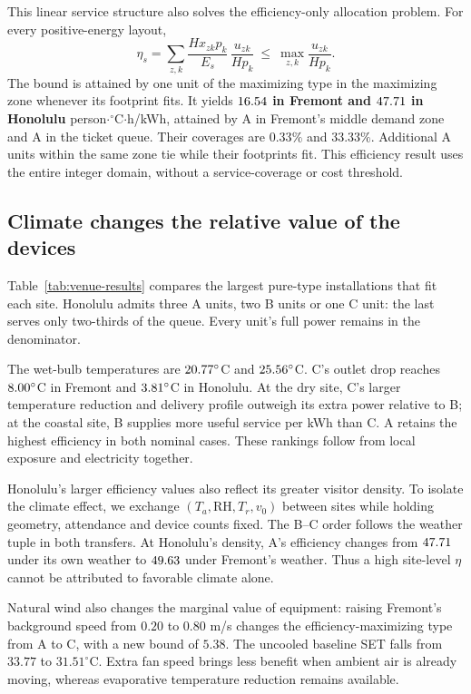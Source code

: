 This linear service structure also solves the efficiency-only allocation problem. For every positive-energy layout,
\begin{equation}
 \eta_s=\sum_{z,k}\frac{Hx_{zk}p_k}{E_s}\,
                  \frac{u_{zk}}{Hp_k}
 \ \le\ \max_{z,k}\frac{u_{zk}}{Hp_k}.
\label{eq:venue-bound}
\end{equation}
The bound is attained by one unit of the maximizing type in the maximizing zone whenever its footprint fits. It yields \textbf{$16.54$ in Fremont and $47.71$ in Honolulu} person$\cdot{}^\circ$C$\cdot$h/kWh, attained by A in Fremont's middle demand zone and A in the ticket queue. Their coverages are $0.33\%$ and $33.33\%$. Additional A units within the same zone tie while their footprints fit. This efficiency result uses the entire integer domain, without a service-coverage or cost threshold.

\subsection{Climate changes the relative value of the devices}
Table~\ref{tab:venue-results} compares the largest pure-type installations that fit each site. Honolulu admits three A units, two B units or one C unit: the last serves only two-thirds of the queue. Every unit's full power remains in the denominator.


The wet-bulb temperatures are $20.77^\circ$C and $25.56^\circ$C. C's outlet drop reaches $8.00^\circ$C in Fremont and $3.81^\circ$C in Honolulu. At the dry site, C's larger temperature reduction and delivery profile outweigh its extra power relative to B; at the coastal site, B supplies more useful service per kWh than C. A retains the highest efficiency in both nominal cases. These rankings follow from local exposure and electricity together.



Honolulu's larger efficiency values also reflect its greater visitor density. To isolate the climate effect, we exchange $(T_a,\mathrm{RH},T_r,v_0)$ between sites while holding geometry, attendance and device counts fixed. The B--C order follows the weather tuple in both transfers. At Honolulu's density, A's efficiency changes from $47.71$ under its own weather to $49.63$ under Fremont's weather. Thus a high site-level $\eta$ cannot be attributed to favorable climate alone.

Natural wind also changes the marginal value of equipment: raising Fremont's background speed from $0.20$ to $0.80$ m/s changes the efficiency-maximizing type from A to C, with a new bound of $5.38$. The uncooled baseline SET falls from $33.77$ to $31.51^\circ$C. Extra fan speed brings less benefit when ambient air is already moving, whereas evaporative temperature reduction remains available.

